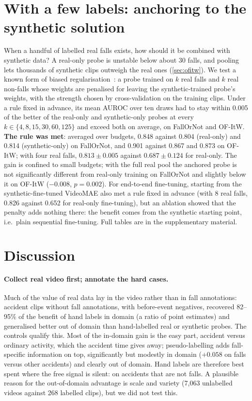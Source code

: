 \documentclass[10pt,twocolumn,letterpaper]{article}
\begin{document}
\section{With a few labels: anchoring to the synthetic solution}\label{sec:anchor}
When a handful of labelled real falls exists, how should it be combined with synthetic data? A real-only probe is unstable below about 30 falls, and pooling lets thousands of synthetic clips outweigh the real ones (\cref{sec:ofitw}). We test a known form of biased regularisation~\cite{yang2007asvm,kuzborskij2013,li2018l2sp}: a probe trained on $k$ real falls and $k$ real non-falls whose weights are penalised for leaving the synthetic-trained probe's weights, with the strength chosen by cross-validation on the training clips. Under a rule fixed in advance, its mean AUROC over ten draws had to stay within 0.005 of the better of the real-only and synthetic-only probes at every $k\in\{4,8,15,30,60,125\}$ and exceed both on average, on FallOrNot and OF-ItW. \textbf{The rule was met}: averaged over budgets, 0.848 against 0.804 (real-only) and 0.814 (synthetic-only) on FallOrNot, and 0.901 against 0.867 and 0.873 on OF-ItW; with four real falls, $0.813\pm0.005$ against $0.687\pm0.124$ for real-only. The gain is confined to small budgets; with the full real pool the anchored probe is not significantly different from real-only training on FallOrNot and slightly below it on OF-ItW ($-0.008$, $p=0.002$). For end-to-end fine-tuning, starting from the synthetic-fine-tuned VideoMAE also met a rule fixed in advance (with 8 real falls, 0.826 against 0.652 for real-only fine-tuning), but an ablation showed that the penalty adds nothing there: the benefit comes from the synthetic starting point, i.e.\ plain sequential fine-tuning. Full tables are in the supplementary material.

\section{Discussion}
\paragraph{Collect real video first; annotate the hard cases.} Much of the value of real data lay in the video rather than in fall annotations: accident clips without fall annotations, with before-event negatives, recovered 82--95\% of the benefit of hand labels in domain (a ratio of point estimates) and generalised better out of domain than hand-labelled real or synthetic probes. The controls qualify this. Most of the in-domain gain is the easy part, accident versus ordinary activity, which the accident time gives away; pseudo-labelling adds fall-specific information on top, significantly but modestly in domain ($+0.058$ on falls versus other accidents) and clearly out of domain. Hand labels are therefore best spent where the free signal is silent: on accidents that are not falls. A plausible reason for the out-of-domain advantage is scale and variety (7,063 unlabelled videos against 268 labelled clips), but we did not test this.
\end{document}
